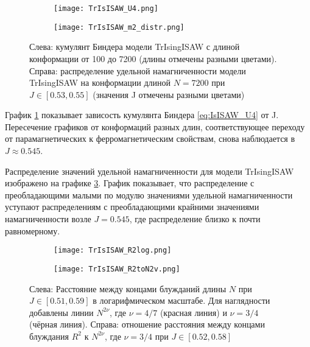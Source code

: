 \begin{figure}[h]
\begin{subfigure}{0.49\textwidth}
\texttt{[image: TrIsISAW\_U4.png]}
\caption{}
\label{fig:TrIsISAW_U4}
\end{subfigure}
\hfill
\begin{subfigure}{0.49\textwidth}
\texttt{[image: TrIsISAW\_m2\_distr.png]}
\caption{}
\label{fig:TrIsISAW_m2_distr}
\end{subfigure}
\caption{Слева: кумулянт Биндера модели TrIsingISAW с длиной конформации от 100 до 7200 (длины отмечены разными цветами).
Справа: распределение удельной намагниченности модели TrIsingISAW на конформации длиной $N=7200$ при $J \in [0.53,0.55]$ (значения J отмечены разными цветами)}
\end{figure}


График \ref{fig:TrIsISAW_U4} показывает зависость кумулянта Биндера \eqref{eq:IsISAW_U4} от J. 
Пересечение графиков от конформаций разных длин, соответствующее переходу от парамагнетических к ферромагнетическим свойствам, снова наблюдается в $J \approx 0.545$.

Распределение значений удельной намагниченности для модели TrIsingISAW изображено на графике \ref{fig:TrIsISAW_m2_distr}.
График показывает, что распределение с преобладающими малыми по модулю значениями удельной намагниченности уступают 
распределениям с преобладающими крайними значениями намагниченности возле $J=0.545$, где распределение близко к почти равномерному.


\begin{figure}[h]
\begin{subfigure}{0.49\textwidth}
\texttt{[image: TrIsISAW\_R2log.png]}
\caption{}
\label{fig:TrIsISAW_R2log}
\end{subfigure}
\hfill
\begin{subfigure}{0.49\textwidth}
\texttt{[image: TrIsISAW\_R2toN2v.png]}
\caption{}
\label{fig:TrIsISAW_R2toN2v}
\end{subfigure}
\caption{Слева: Расстояние между концами блужданий длины $N$ при $J \in [0.51,0.59]$ в логарифмическом масштабе. 
Для наглядности добавлены линии $N^{2\nu}$, где $\nu = 4/7$ (красная линия) и $\nu=3/4$ (чёрная линия).
Справа: отношение расстояния между концами блуждания $R^2$ к $N^{2\nu}$, где $\nu=3/4$ при $J \in [0.52,0.58]$}
\end{figure}

